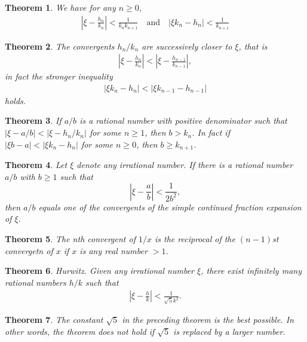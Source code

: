 \documentclass{amsart}
\newtheorem{theorem}{Theorem}
\theoremstyle{definition}
\begin{document}
\begin{theorem}
  We have for any $n \geq 0$,
  \begin{align*}
    \left| \xi - \frac{h_n}{k_n} \right|
    < 
    \frac{1}{k_n k_{n+1}}
    \quad
    \text{and}
    \quad
    | \xi k_n - h_n | < \frac{1}{k_{n+1}}
  \end{align*}
\end{theorem}

\begin{theorem}
  The convergents $h_n / k_n$ are successively closer to $\xi$, that is
  \begin{align*}
    \left| \xi - \frac{h_n}{k_n} \right|
    < 
    \left| \xi - \frac{h_{n-1}}{k_{n-1}} \right|,
  \end{align*}
  in fact the stronger inequality
  \begin{align*}
    \left| \xi k_{n} - h_{n} \right|
    < 
    \left| \xi k_{n-1} - h_{n-1} \right|
  \end{align*}
  holds.
\end{theorem}

\begin{theorem}
  If $a/b$ is a rational number with positive denominator such that 
  $|\xi - a/b | < |\xi - h_n/k_n|$ for some $n \geq 1$, then
  $b > k_n$.
  In fact if $|\xi b - a| < |\xi k_n - h_n|$ for some
  $n \geq 0$, then $b \geq k_{n+1}$.
\end{theorem}

\begin{theorem}
  Let $\xi$ denote any irrational number.
  If there is a rational number $a/b$ with $b \geq 1$ such that
  \[
    \left| \xi - \frac{a}{b} \right| < \frac{1}{2b^2},
  \]
  then $a/b$ equals one of the convergents of the simple continued fraction 
  expansion of $\xi$.
\end{theorem}

\begin{theorem}
  The nth convergent of $1/x$ is the reciprocal of the 
  $(n-1)$st convergetn of $x$ if $x$ is any real number $> 1$.
\end{theorem}

\begin{theorem}
  Hurwitz. Given any irrational number $\xi$, there exist
  infinitely many rational numbers $h/k$ such that
  \begin{align*}
    \left| \xi - \frac{h}{k} \right| < \frac{1}{\sqrt{5}k^2}.
  \end{align*}
\end{theorem}

\begin{theorem}
  The constant $\sqrt{5}$ in the preceding theorem is the best
  possible.
  In other words, the theorem does not hold if $\sqrt{5}$ is
  replaced by a larger number.
\end{theorem}
\end{document}
